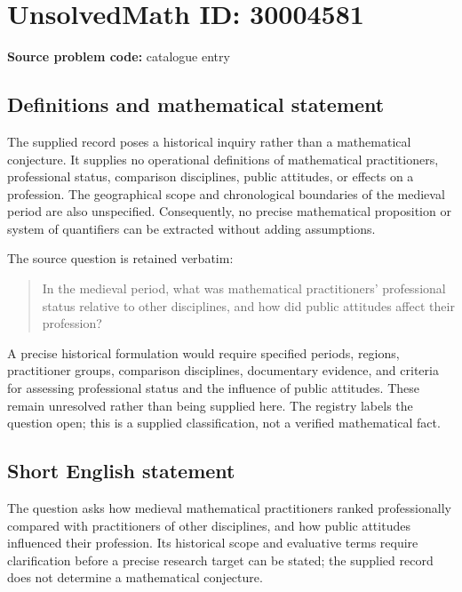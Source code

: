 \documentclass[11pt]{article}
\begin{document}
\section*{UnsolvedMath ID: 30004581}
\textbf{Source problem code:} catalogue entry
\subsection{Definitions and mathematical statement}
The supplied record poses a historical inquiry rather than a mathematical conjecture. It supplies no operational definitions of mathematical practitioners, professional status, comparison disciplines, public attitudes, or effects on a profession. The geographical scope and chronological boundaries of the medieval period are also unspecified. Consequently, no precise mathematical proposition or system of quantifiers can be extracted without adding assumptions.

The source question is retained verbatim:
\begin{quote}
In the medieval period, what was mathematical practitioners' professional status relative to other disciplines, and how did public attitudes affect their profession?
\end{quote}

A precise historical formulation would require specified periods, regions, practitioner groups, comparison disciplines, documentary evidence, and criteria for assessing professional status and the influence of public attitudes. These remain unresolved rather than being supplied here. The registry labels the question open; this is a supplied classification, not a verified mathematical fact.
\subsection{Short English statement}
The question asks how medieval mathematical practitioners ranked professionally compared with practitioners of other disciplines, and how public attitudes influenced their profession. Its historical scope and evaluative terms require clarification before a precise research target can be stated; the supplied record does not determine a mathematical conjecture.
\end{document}
